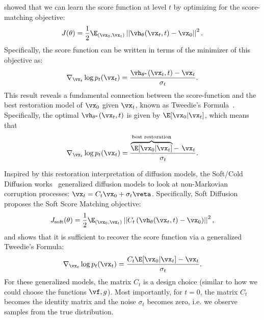 \documentclass{article}
\begin{document}
\citet {vincent2011connection} showed that we can learn the score function at level $t$ by optimizing for the score-matching objective:
\begin{gather}
    J(\theta) = \frac{1}{2}\E_{(\vx_0, \vx_t)}\left|\left| \vh_{\theta}(\vx_t, t) - \vx_0\right|\right|^2.
\end{gather}
Specifically, the score function can be written in terms of the minimizer of this objective as:
\begin{gather}
    \nabla_{\vx_t}\log p_t(\vx_t) = \frac{\vh_{\theta^*}(\vx_t, t) - \vx_t}{\sigma_t}.
    \label{eq:tweedie-old}
\end{gather}
This result reveals a fundamental connection between the score-function and the best restoration model of $\vx_0$ given $\vx_t$, known as Tweedie's Formula~\citep{efron2011tweedie}. Specifically, the optimal $\vh_{\theta^*}(\vx_t, t)$ is given by $\E[\vx_0 | \vx_t]$, which means that \begin{gather}
    \nabla_{\vx_t}\log p_t(\vx_t) = \frac{\overbrace{\E[\vx_0 | \vx_t]}^{\text{best restoration}} - \ \vx_t}{\sigma_t}.
    \label{eq:tweedie}
\end{gather}

Inspired by this restoration interpretation of diffusion models, the Soft/Cold Diffusion works~\citep{daras2023soft, bansal2022cold} generalized diffusion models to look at non-Markovian corruption processes: $\vx_t = C_t\vx_0 + \sigma_t \veta$. Specifically, Soft Diffusion proposes the Soft Score Matching objective:
\begin{gather}\label{eq:soft-score}
    J_{\mathrm{soft}}(\theta) = \frac{1}{2}\E_{(\vx_0, \vx_t)}\left|\left| C_t\left(\vh_{\theta}(\vx_t, t) - \vx_0\right)\right|\right|^2,
\end{gather}
and shows that it is sufficient to recover the score function via a generalized Tweedie's Formula: \begin{gather}
    \nabla_{\vx_t}\log p_t(\vx_t) = \frac{C_t\E[\vx_0 | \vx_t] - \vx_t}{\sigma_t}.
\end{gather}
For these generalized models, the matrix $C_t$ is a design choice (similar to how we could choose the functions $\vf, g$). Most importantly, for $t=0$, the matrix $C_t$ becomes the identity matrix and the noise $\sigma_t$ becomes zero, i.e. we observe samples from the true distribution.
\end{document}
